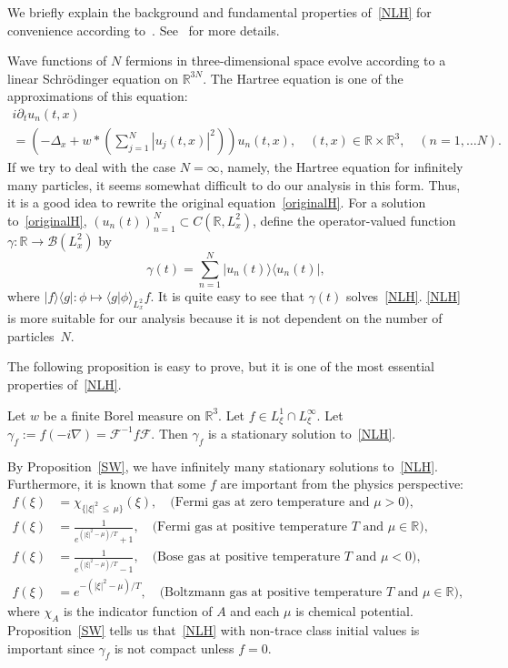 \documentclass[10pt,a4paper]{amsart}
\newcommand{\BR}{\mathbb{R}}
\newcommand{\CB}{\mathcal{B}}
\newcommand{\CF}{\mathcal{F}}
\newcommand{\ga}{\gamma}
\newcommand{\ch}{\chi}
\newcommand{\pl}{\partial}
\newcommand{\Br}[1]{\langle #1 \rangle}
\newcommand{\I}{\infty}
\newcommand{\R}{\mathbb{R}}
\begin{document}
We briefly explain the background and fundamental properties of~\eqref{NLH} for convenience according to~\cite{2015LS}. See~\cite[Introduction]{2015LS} for more details.

Wave functions of $N$ fermions in three-dimensional space evolve according to a linear Schr\"odinger equation on $\BR^{3N}$. The Hartree equation is one of the approximations of this equation:
\begin{multline}\label{originalH}
i \pl_t u_n(t,x) \\
= \left(- \Delta_x + w \ast \left(\sum_{j=1}^N \left|u_j(t,x)\right|^2 \right) \right) u_n(t,x),
\quad (t,x) \in \BR \times \BR^3, \quad (n=1, \dots N).
\end{multline}
If we try to deal with the case $N = \I$, namely, the Hartree equation for infinitely many particles, it seems somewhat difficult to do our analysis in this form. Thus, it is a good idea to rewrite the original equation~\eqref{originalH}. For a solution to~\eqref{originalH}, $(u_n(t))_{n=1}^N \subset C(\BR, L^2_x)$, define the operator-valued function $\ga : \BR \to \CB(L^2_x)$ by
\begin{equation*}
\ga(t) = \sum_{n=1}^N |u_n(t)\rangle \langle u_n(t)|,
\end{equation*}
where $|f \rangle \langle g | : \phi \mapsto \Br{g | \phi}_{L^2_x} f$. It is quite easy to see that $\ga(t)$ solves~\eqref{NLH}. \eqref{NLH} is more suitable for our analysis because it is not dependent on the number of particles~$N$.

The following proposition is easy to prove, but it is one of the most essential properties of~\eqref{NLH}.

\begin{prop}\label{SW}
Let $w$ be a finite Borel measure on $\BR^3$. Let $f \in L^1_\xi \cap L^\I_\xi$. Let $\ga_f := f(- i \nabla)= \CF^{-1} f \CF$. Then $\ga_f$ is a stationary solution to~\eqref{NLH}.
\end{prop}

By Proposition~\ref{SW}, we have infinitely many stationary solutions to~\eqref{NLH}. Furthermore, it is known that some $f$ are important from the physics perspective:
\begin{align}
f(\xi) &= \ch_{\{|\xi|^2\,\leq\,\mu\}}(\xi),\quad \text{(Fermi gas at zero temperature and $\mu >0$)}, \label{P1}
\\
f(\xi) &= \frac{1}{e^{(|\xi|^2-\mu)/T}+1}, \quad \text{(Fermi gas at positive temperature $T$ and $\mu \in \R$)}, \label{P2}
\\
f(\xi) &= \frac{1}{e^{(|\xi|^2-\mu)/T}-1}, \quad \text{(Bose gas at positive temperature $T$ and $\mu < 0$)}, \label{P3}
\\
f(\xi) &= e^{-(|\xi|^2-\mu)/T}, \quad \text{(Boltzmann gas at positive temperature $T$ and $\mu \in \R$)}, \label{P4}
\end{align}
where $\ch_A$ is the indicator function of $A$ and each $\mu$ is chemical potential. Proposition~\ref{SW} tells us that~\eqref{NLH} with non-trace class initial values is important since $\ga_f$ is not compact unless $f=0$.
\end{document}
